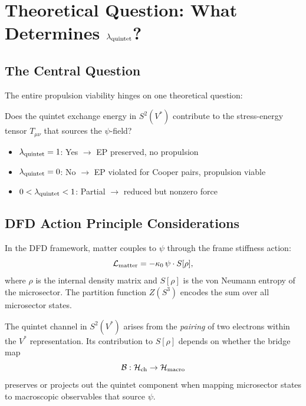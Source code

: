 \documentclass[12pt,a4paper]{article}
\theoremstyle{definition}
\theoremstyle{remark}
\begin{document}
\section{Theoretical Question: What Determines $\lambda_{\rm quintet}$?}
\label{sec:theory}

\subsection{The Central Question}

The entire propulsion viability hinges on one theoretical question:

\begin{tcolorbox}[colframe=red!75!black, colback=red!5!white,
title={The $\lambda_{\rm quintet}$ Question}]
Does the quintet exchange energy in $S^2(V^*)$ contribute to the
stress-energy tensor $T_{\mu\nu}$ that sources the $\psi$-field?

\begin{itemize}
\item $\lambda_{\rm quintet} = 1$: Yes $\to$ EP preserved, no propulsion
\item $\lambda_{\rm quintet} = 0$: No $\to$ EP violated for Cooper pairs, propulsion viable
\item $0 < \lambda_{\rm quintet} < 1$: Partial $\to$ reduced but nonzero force
\end{itemize}
\end{tcolorbox}

\subsection{DFD Action Principle Considerations}

In the DFD framework, matter couples to $\psi$ through the frame stiffness
action:
\begin{equation}
\mathcal{L}_{\rm matter} = -\kappa_0\,\psi \cdot S[\rho],
\end{equation}
where $\rho$ is the internal density matrix and $S[\rho]$ is the von Neumann
entropy of the microsector.  The partition function $Z(S^3)$ encodes the sum
over all microsector states.

The quintet channel in $S^2(V^*)$ arises from the \emph{pairing} of two
electrons within the $V^*$ representation.  Its contribution to $S[\rho]$
depends on whether the bridge map
\begin{equation}
\mathcal{B}: \mathcal{H}_{\rm ch} \to \mathcal{H}_{\rm macro}
\end{equation}
preserves or projects out the quintet component when mapping microsector
states to macroscopic observables that source $\psi$.
\end{document}

